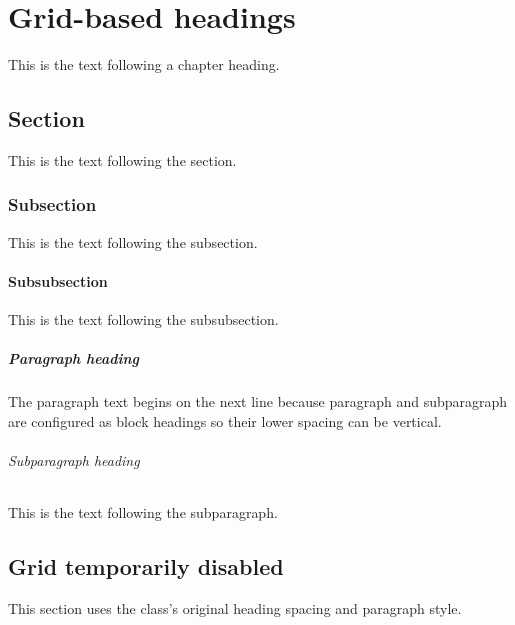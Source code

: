 \documentclass{report}
\begin{document}
\chapter{Grid-based headings}
This is the text following a chapter heading.

\section{Section}
This is the text following the section.

\subsection{Subsection}
This is the text following the subsection.

\subsubsection{Subsubsection}
This is the text following the subsubsection.

\paragraph{Paragraph heading}
The paragraph text begins on the next line because paragraph and subparagraph
are configured as block headings so their lower spacing can be vertical.

\subparagraph{Subparagraph heading}
This is the text following the subparagraph.

\begin{gridautoff}
\section{Grid temporarily disabled}
This section uses the class's original heading spacing and paragraph style.
\end{gridautoff}
\end{document}
